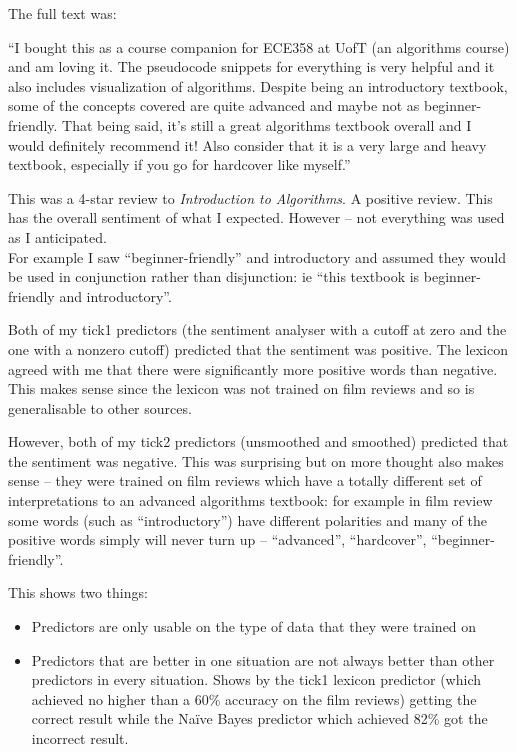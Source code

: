 \documentclass[10pt,\jkfside,a4paper]{article}
\begin{document}
\begin{enumerate}
The full text was:

``I bought this as a course companion for ECE358 at UofT (an algorithms course) and am loving it. 
The pseudocode snippets for everything is very helpful and it also includes visualization of algorithms. 
Despite being an introductory textbook, some of the concepts covered are quite advanced and maybe not 
as beginner-friendly. That being said, it's still a great algorithms textbook overall and I would definitely 
recommend it! Also consider that it is a very large and heavy textbook, especially if you go for hardcover 
like myself.''

This was a 4-star review to \textit{Introduction to Algorithms}. A positive review. This has the overall 
sentiment of what I expected. However -- not everything was used as I anticipated.\\
For example I saw ``beginner-friendly'' and introductory and assumed they would be used in conjunction 
rather than disjunction: ie ``this textbook is beginner-friendly and introductory''.

Both of my tick1 predictors (the sentiment analyser with a cutoff at zero and the one with a nonzero cutoff) 
predicted that the sentiment was positive. The lexicon agreed with me that there were significantly more 
positive words than negative. This makes sense since the lexicon was not trained on film reviews and so is 
generalisable to other sources.

However, both of my tick2 predictors (unsmoothed and smoothed) predicted that the sentiment was negative. 
This was surprising but on more thought also makes sense -- they were trained on film reviews which 
have a totally different set of interpretations to an advanced algorithms textbook: for example in film 
review some words (such as ``introductory'') have different polarities and many of the positive words 
simply will never turn up -- ``advanced'', ``hardcover'', ``beginner-friendly''.

This shows two things: 
\begin{itemize}
\item Predictors are only usable on the type of data that they were trained on
\item Predictors that are better in one situation are not always better than other predictors in 
every situation. Shows by the tick1 lexicon predictor (which achieved no higher than a 60\% accuracy on the 
film reviews) getting the correct result while the Na\"ive Bayes predictor which achieved 82\% got the 
incorrect result.
\end{itemize}


\end{enumerate}
\end{document}
